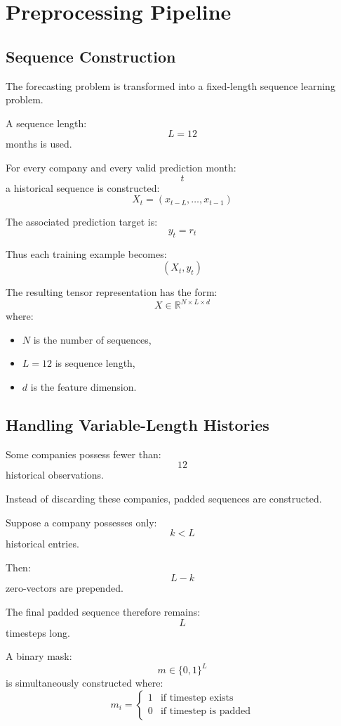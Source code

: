 \documentclass[11pt]{article}
\begin{document}
\section{Preprocessing Pipeline}

\subsection{Sequence Construction}

The forecasting problem is transformed into a fixed-length sequence learning problem.

A sequence length:
\[
L = 12
\]
months is used.

For every company and every valid prediction month:
\[
t
\]
a historical sequence is constructed:
\[
X_t
=
(x_{t-L},\dots,x_{t-1})
\]

The associated prediction target is:
\[
y_t = r_t
\]

Thus each training example becomes:
\[
(X_t,y_t)
\]

The resulting tensor representation has the form:
\[
X
\in
\mathbb{R}^{N \times L \times d}
\]
where:
\begin{itemize}
    \item \(N\) is the number of sequences,
    \item \(L=12\) is sequence length,
    \item \(d\) is the feature dimension.
\end{itemize}

\subsection{Handling Variable-Length Histories}

Some companies possess fewer than:
\[
12
\]
historical observations.

Instead of discarding these companies, padded sequences are constructed.

Suppose a company possesses only:
\[
k < L
\]
historical entries.

Then:
\[
L-k
\]
zero-vectors are prepended.

The final padded sequence therefore remains:
\[
L
\]
timesteps long.

A binary mask:
\[
m \in \{0,1\}^L
\]
is simultaneously constructed where:
\[
m_i
=
\begin{cases}
1 & \text{if timestep exists} \\
0 & \text{if timestep is padded}
\end{cases}
\]
\end{document}
